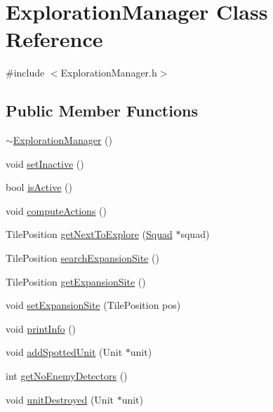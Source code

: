 \hypertarget{class_exploration_manager}{\section{Exploration\-Manager Class Reference}
\label{class_exploration_manager}
}


{\ttfamily \#include $<$Exploration\-Manager.\-h$>$}

\subsection*{Public Member Functions}
\begin{DoxyCompactItemize}
\item 
\hyperlink{class_exploration_manager_a4a57562735f2726c292263069c230b82}{$\sim$\-Exploration\-Manager} ()
\item 
void \hyperlink{class_exploration_manager_a02b37f885bd230031e3f88cd59142739}{set\-Inactive} ()
\item 
bool \hyperlink{class_exploration_manager_a85a400f645b4c2cb06be6e2432a03a86}{is\-Active} ()
\item 
void \hyperlink{class_exploration_manager_a12d28742ee52b7b1e346e207407418f5}{compute\-Actions} ()
\item 
Tile\-Position \hyperlink{class_exploration_manager_afadc17819584bf0dc2278bdbbe51ba15}{get\-Next\-To\-Explore} (\hyperlink{class_squad}{Squad} $\ast$squad)
\item 
Tile\-Position \hyperlink{class_exploration_manager_a16610708e583b0249221feced788aa0e}{search\-Expansion\-Site} ()
\item 
Tile\-Position \hyperlink{class_exploration_manager_a912fb84ce3563759e2547b86c5e39ecc}{get\-Expansion\-Site} ()
\item 
void \hyperlink{class_exploration_manager_ae8ebcf92769caaf505f82c25d4b9982b}{set\-Expansion\-Site} (Tile\-Position pos)
\item 
void \hyperlink{class_exploration_manager_a6fc2e3258037b4d8fb52fa24ab6c5f1a}{print\-Info} ()
\item 
void \hyperlink{class_exploration_manager_a0a06516952a01099a41993a4ce44621f}{add\-Spotted\-Unit} (Unit $\ast$unit)
\item 
int \hyperlink{class_exploration_manager_abf9a57f87f3ebb778dac95d60a091b9e}{get\-No\-Enemy\-Detectors} ()
\item 
void \hyperlink{class_exploration_manager_acc423ab64c13c9e63ec2cd83f7cc3ccb}{unit\-Destroyed} (Unit $\ast$unit)

\end{DoxyCompactItemize}
